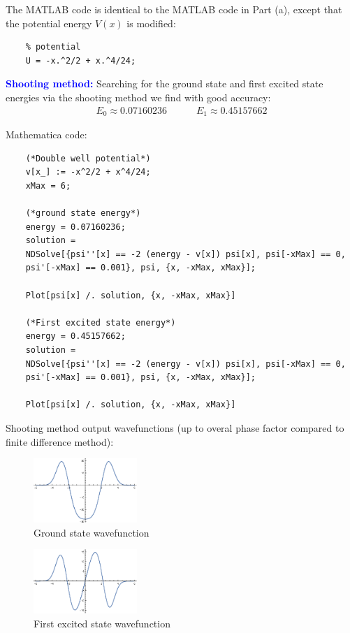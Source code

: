 \documentclass{article}
\theoremstyle{definition}
\begin{document}
\begin{enumerate}[label=(\alph*)]
	
	The MATLAB code is identical to the MATLAB code in Part (a), except that the potential energy $V(x)$ is modified:
	\begin{lstlisting}
	% potential
	U = -x.^2/2 + x.^4/24;
	\end{lstlisting}
	
	
	
	
	
	\textbf{\textcolor{blue}{Shooting method:}} Searching for the ground state and first excited state energies via the shooting method we find with good accuracy:
	\begin{align*}
	\boxed{E_0 \approx 0.07160236} \quad\quad\quad \boxed{E_1 \approx 0.45157662}
	\end{align*} 
	
	Mathematica code:
	\begin{lstlisting}
	(*Double well potential*)
	v[x_] := -x^2/2 + x^4/24;
	xMax = 6;
	
	(*ground state energy*)
	energy = 0.07160236;
	solution = 
	NDSolve[{psi''[x] == -2 (energy - v[x]) psi[x], psi[-xMax] == 0, 
	psi'[-xMax] == 0.001}, psi, {x, -xMax, xMax}];
	
	Plot[psi[x] /. solution, {x, -xMax, xMax}]
	
	(*First excited state energy*)
	energy = 0.45157662;
	solution = 
	NDSolve[{psi''[x] == -2 (energy - v[x]) psi[x], psi[-xMax] == 0, 
	psi'[-xMax] == 0.001}, psi, {x, -xMax, xMax}];
	
	Plot[psi[x] /. solution, {x, -xMax, xMax}]
	\end{lstlisting}
	
	Shooting method output wavefunctions (up to overal phase factor compared to finite difference method):
	
	\begin{figure}[!htb]
		\centering
		\includegraphics[width=0.35\textwidth]{problem3b1.eps}
		\caption{Ground state wavefunction}
	\end{figure}

	\begin{figure}[!htb]
		\centering
		\includegraphics[width=0.35\textwidth]{problem3b2.eps}
		\caption{First excited state wavefunction}
	\end{figure}
	

\end{enumerate}
\end{document}
